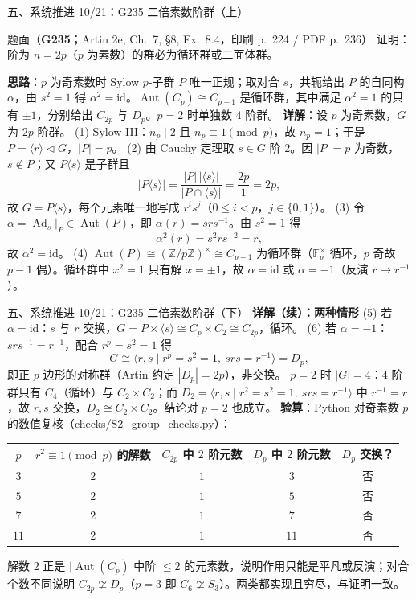 \documentclass[aspectratio=169,10pt,fontset=none]{ctexbeamer}
\newcommand{\ex}[1]{\textcolor{accent}{\footnotesize\bfseries #1}}
\newcommand{\key}[1]{\textcolor{ink}{\bfseries #1}}
\begin{document}
\begin{frame}[t]{五、系统推进 10/21：G235 二倍素数阶群（上）}
\label{ex:G235}
\scriptsize
\begin{block}{\footnotesize 题面（\ex{G235}；Artin 2e, Ch.~7, §8, Ex.~8.4，印刷 p.~224 / PDF p.~236）}
证明：阶为 $n=2p$（$p$ 为素数）的群必为循环群或二面体群。
\end{block}
\key{思路}：$p$ 为奇素数时 Sylow $p$-子群 $P$ 唯一正规；取对合 $s$，共轭给出 $P$ 的自同构 $\alpha$，由 $s^2=1$ 得 $\alpha^2=\mathrm{id}$。$\operatorname{Aut}(C_p)\cong C_{p-1}$ 是循环群，其中满足 $\alpha^2=1$ 的只有 $\pm1$，分别给出 $C_{2p}$ 与 $D_p$。$p=2$ 时单独数 $4$ 阶群。
\key{详解}：设 $p$ 为奇素数，$G$ 为 $2p$ 阶群。
(1) Sylow III：$n_p\mid 2$ 且 $n_p\equiv1\pmod p$，故 $n_p=1$；于是 $P=\langle r\rangle\triangleleft G$，$|P|=p$。
(2) 由 Cauchy 定理取 $s\in G$ 阶 $2$。因 $|P|=p$ 为奇数，$s\notin P$；又 $P\langle s\rangle$ 是子群且
\[ |P\langle s\rangle|=\frac{|P|\,|\langle s\rangle|}{|P\cap\langle s\rangle|}=\frac{2p}{1}=2p, \]
故 $G=P\langle s\rangle$，每个元素唯一地写成 $r^i s^j$（$0\le i<p$，$j\in\{0,1\}$）。
(3) 令 $\alpha=\operatorname{Ad}_s|_P\in\operatorname{Aut}(P)$，即 $\alpha(r)=srs^{-1}$。由 $s^2=1$ 得
\[ \alpha^2(r)=s^2rs^{-2}=r, \]
故 $\alpha^2=\mathrm{id}$。
(4) $\operatorname{Aut}(P)\cong(\mathbb Z/p\mathbb Z)^\times\cong C_{p-1}$ 为循环群（$\mathbb F_p^\times$ 循环，$p$ 奇故 $p-1$ 偶）。循环群中 $x^2=1$ 只有解 $x=\pm1$，故 $\alpha=\mathrm{id}$ 或 $\alpha=-1$（反演 $r\mapsto r^{-1}$）。
\end{frame}

\begin{frame}[t]{五、系统推进 10/21：G235 二倍素数阶群（下）}
\scriptsize
\key{详解（续）：两种情形}
(5) 若 $\alpha=\mathrm{id}$：$s$ 与 $r$ 交换，$G=P\times\langle s\rangle\cong C_p\times C_2\cong C_{2p}$，循环。
(6) 若 $\alpha=-1$：$srs^{-1}=r^{-1}$，配合 $r^p=s^2=1$ 得
\[ G\cong\langle r,s\mid r^p=s^2=1,\ srs=r^{-1}\rangle=D_p, \]
即正 $p$ 边形的对称群（Artin 约定 $|D_p|=2p$），非交换。
$p=2$ 时 $|G|=4$：$4$ 阶群只有 $C_4$（循环）与 $C_2\times C_2$；而 $D_2=\langle r,s\mid r^2=s^2=1,\ srs=r^{-1}\rangle$ 中 $r^{-1}=r$，故 $r,s$ 交换，$D_2\cong C_2\times C_2$。结论对 $p=2$ 也成立。
\key{验算}：Python 对奇素数 $p$ 的数值复核（\textsf{checks/S2\_group\_checks.py}）：
\begin{center}
\begin{tabular}{@{}ccccc@{}}
\toprule
$p$ & $r^2\equiv1\pmod p$ 的解数 & $C_{2p}$ 中 $2$ 阶元数 & $D_p$ 中 $2$ 阶元数 & $D_p$ 交换？\\
\midrule
$3$ & $2$ & $1$ & $3$ & 否\\
$5$ & $2$ & $1$ & $5$ & 否\\
$7$ & $2$ & $1$ & $7$ & 否\\
$11$ & $2$ & $1$ & $11$ & 否\\
\bottomrule
\end{tabular}
\end{center}
解数 $2$ 正是 $|\operatorname{Aut}(C_p)$ 中阶 $\le2$ 的元素数，说明作用只能是平凡或反演；对合个数不同说明 $C_{2p}\not\cong D_p$（$p=3$ 即 $C_6\not\cong S_3$）。两类都实现且穷尽，与证明一致。
\end{frame}
\end{document}
